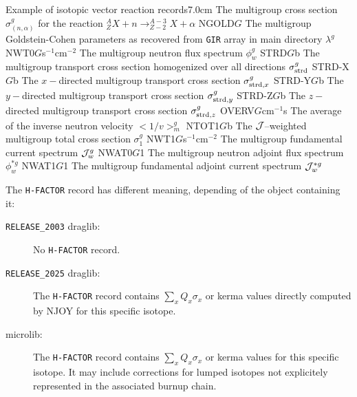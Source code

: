 \begin{DescriptionEnregistrement}{Example of isotopic vector reaction records}{7.0cm}
  {The multigroup cross section
   $\sigma_{(n,\alpha)}^{g}$ for the reaction 
   $^{A}_{Z}X+n \to ^{A-3}_{Z-2}X+\alpha$ }
\RealEnr
  {NGOLD}{$G$}{} 
  {The multigroup Goldstein-Cohen parameters as recovered from {\tt GIR} array in main  directory
   $\lambda^{g}$}
\RealEnr
  {NWT0}{$G$}{s$^{-1}$cm$^{-2}$}
  {The multigroup neutron flux spectrum $\phi_{w}^{g}$} 
\RealEnr
  {STRD}{$G$}{b}
  {The multigroup transport cross section 
   homogenized over all directions
   $\sigma_{\rm strd}^{g}$}
\RealEnr
  {STRD-X}{$G$}{b} 
  {The $x-$directed multigroup transport cross
   section $\sigma_{{\rm strd},x}^{g}$}
\RealEnr
  {STRD-Y}{$G$}{b} 
  {The $y-$directed multigroup transport cross
   section $\sigma_{{\rm strd},y}^{g}$}
\RealEnr
  {STRD-Z}{$G$}{b}
  {The $z-$directed multigroup transport cross
   section $\sigma_{{\rm strd},z}^{g}$}
\RealEnr
  {OVERV}{$G$}{cm$^{-1}$s}
  {The average of the inverse neutron velocity \hbox{$<1/v>_{m}^g$}}
\RealEnr
  {NTOT1}{$G$}{b}
  {The ${\cal J}$--weighted multigroup total cross section $\sigma_1^{g}$}
\RealEnr
  {NWT1}{$G$}{s$^{-1}$cm$^{-2}$}
  {The multigroup fundamental current spectrum ${\cal J}_{w}^{g}$} 
\RealEnr
  {NWAT0}{$G$}{1}
  {The multigroup neutron adjoint flux spectrum $\phi_{w}^{*g}$} 
\RealEnr
  {NWAT1}{$G$}{1}
  {The multigroup fundamental adjoint current spectrum ${\cal J}_{w}^{*g}$} 
\end{DescriptionEnregistrement}

\vskip 0.2cm

The {\tt H-FACTOR} record has different meaning, depending of the object containing it:
\begin{description}
\item[{\tt RELEASE\_2003} draglib:] No {\tt H-FACTOR} record.
\item[{\tt RELEASE\_2025} draglib:] The {\tt H-FACTOR} record contains $\sum_x Q_x \sigma_x$ or kerma values directly computed by NJOY for this specific isotope.
\item[microlib:] The {\tt H-FACTOR} record contains $\sum_x Q_x \sigma_x$ or kerma values for this specific isotope. It may include corrections for lumped isotopes not explicitely represented in the associated burnup chain.
\end{description}

